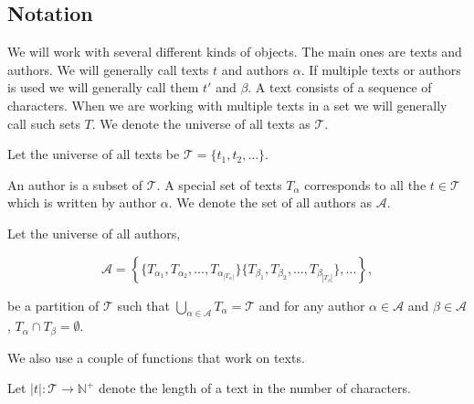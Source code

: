 \subsection{Notation}

We will work with several different kinds of objects. The main ones are texts
and authors. We will generally call texts $t$ and authors $\alpha$. If multiple
texts or authors is used we will generally call them $t'$ and $\beta$. A text
consists of a sequence of characters. When we are working with multiple texts in
a set we will generally call such sets $T$. We denote the universe of all texts
as $\mathcal{T}$.

\begin{definition}
    \label{def:text_universe}

    Let the universe of all texts be $\mathcal{T} = \{t_1, t_2, \dots\}$.

\end{definition}

An author is a subset of $\mathcal{T}$. A special set of texts $T_\alpha$
corresponds to all the $t \in \mathcal{T}$ which is written by author $\alpha$.
We denote the set of all authors as $\mathcal{A}$.

\begin{definition}
    \label{def:author_universe}

    Let the universe of all authors,

    \begin{equation}
        \mathcal{A} = \left\{\{T_{\alpha_1}, T_{\alpha_2}, \dots,
            T_{\alpha_{|T_\alpha|}}\} \{T_{\beta_1}, T_{\beta_2},
            \dots, T_{\beta_{|T_\beta|}}\}, \dots\right\},
    \end{equation}

    be a partition of $\mathcal{T}$ such that $\bigcup_{\alpha \in \mathcal{A}}
    T_\alpha = \mathcal{T}$ and for any author $\alpha \in \mathcal{A}$ and
    $\beta \in \mathcal{A}$, $T_\alpha \cap T_\beta = \emptyset$.

\end{definition}

We also use a couple of functions that work on texts.

\begin{definition}
    \label{def:text_length}

    Let $|t| \colon \mathcal{T} \rightarrow \mathbb{N}^+$ denote the length of a
    text in the number of characters.

\end{definition}

